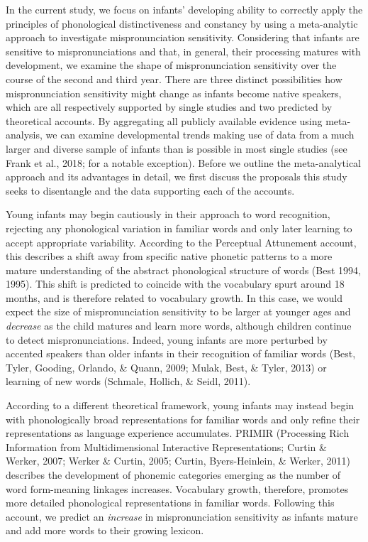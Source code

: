 \documentclass[man]{apa6}
\theoremstyle{definition}
\theoremstyle{definition}
\theoremstyle{definition}
\theoremstyle{remark}
\begin{document}
In the current study, we focus on infants' developing ability to
correctly apply the principles of phonological distinctiveness and
constancy by using a meta-analytic approach to investigate
mispronunciation sensitivity. Considering that infants are sensitive to
mispronunciations and that, in general, their processing matures with
development, we examine the shape of mispronunciation sensitivity over
the course of the second and third year. There are three distinct
possibilities how mispronunciation sensitivity might change as infants
become native speakers, which are all respectively supported by single
studies and two predicted by theoretical accounts. By aggregating all
publicly available evidence using meta-analysis, we can examine
developmental trends making use of data from a much larger and diverse
sample of infants than is possible in most single studies (see Frank et
al., 2018; for a notable exception). Before we outline the
meta-analytical approach and its advantages in detail, we first discuss
the proposals this study seeks to disentangle and the data supporting
each of the accounts.

Young infants may begin cautiously in their approach to word
recognition, rejecting any phonological variation in familiar words and
only later learning to accept appropriate variability. According to the
Perceptual Attunement account, this describes a shift away from specific
native phonetic patterns to a more mature understanding of the abstract
phonological structure of words (Best 1994, 1995). This shift is
predicted to coincide with the vocabulary spurt around 18 months, and is
therefore related to vocabulary growth. In this case, we would expect
the size of mispronunciation sensitivity to be larger at younger ages
and \emph{decrease} as the child matures and learn more words, although
children continue to detect mispronunciations. Indeed, young infants are
more perturbed by accented speakers than older infants in their
recognition of familiar words (Best, Tyler, Gooding, Orlando, \& Quann,
2009; Mulak, Best, \& Tyler, 2013) or learning of new words (Schmale,
Hollich, \& Seidl, 2011).

According to a different theoretical framework, young infants may
instead begin with phonologically broad representations for familiar
words and only refine their representations as language experience
accumulates. PRIMIR (Processing Rich Information from Multidimensional
Interactive Representations; Curtin \& Werker, 2007; Werker \& Curtin,
2005; Curtin, Byers-Heinlein, \& Werker, 2011) describes the development
of phonemic categories emerging as the number of word form-meaning
linkages increases. Vocabulary growth, therefore, promotes more detailed
phonological representations in familiar words. Following this account,
we predict an \emph{increase} in mispronunciation sensitivity as infants
mature and add more words to their growing lexicon.
\end{document}
